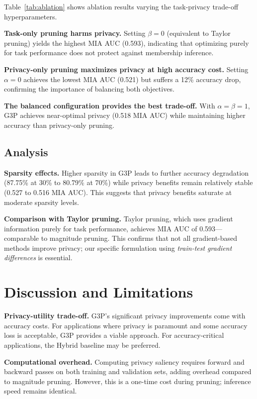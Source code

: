\documentclass[11pt]{article}
\begin{document}
Table~\ref{tab:ablation} shows ablation results varying the task-privacy trade-off hyperparameters.

\textbf{Task-only pruning harms privacy.} Setting $\beta=0$ (equivalent to Taylor pruning) yields the highest MIA AUC (0.593), indicating that optimizing purely for task performance does not protect against membership inference.

\textbf{Privacy-only pruning maximizes privacy at high accuracy cost.} Setting $\alpha=0$ achieves the lowest MIA AUC (0.521) but suffers a 12\% accuracy drop, confirming the importance of balancing both objectives.

\textbf{The balanced configuration provides the best trade-off.} With $\alpha=\beta=1$, G3P achieves near-optimal privacy (0.518 MIA AUC) while maintaining higher accuracy than privacy-only pruning.

\subsection{Analysis}

\textbf{Sparsity effects.} Higher sparsity in G3P leads to further accuracy degradation (87.75\% at 30\% to 80.79\% at 70\%) while privacy benefits remain relatively stable (0.527 to 0.516 MIA AUC). This suggests that privacy benefits saturate at moderate sparsity levels.

\textbf{Comparison with Taylor pruning.} Taylor pruning, which uses gradient information purely for task performance, achieves MIA AUC of 0.593---comparable to magnitude pruning. This confirms that not all gradient-based methods improve privacy; our specific formulation using \emph{train-test gradient differences} is essential.

\section{Discussion and Limitations}

\textbf{Privacy-utility trade-off.} G3P's significant privacy improvements come with accuracy costs. For applications where privacy is paramount and some accuracy loss is acceptable, G3P provides a viable approach. For accuracy-critical applications, the Hybrid baseline may be preferred.

\textbf{Computational overhead.} Computing privacy saliency requires forward and backward passes on both training and validation sets, adding overhead compared to magnitude pruning. However, this is a one-time cost during pruning; inference speed remains identical.
\end{document}
